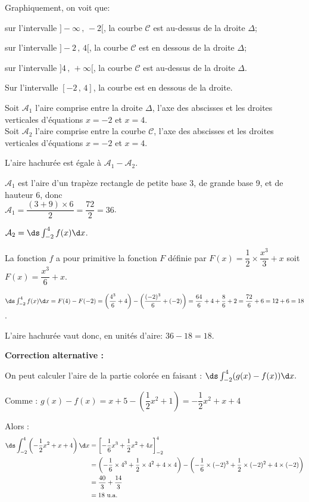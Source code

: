 \medskip

\begin{list}{\textbullet}{Graphiquement, on voit que:}
\item sur l'intervalle $]-\infty\,,\, -2[$, la courbe $\mathcal{C}$ est au-dessus de la droite $\Delta$;
\item sur l'intervalle $]-2\,,\, 4[$, la courbe $\mathcal{C}$ est en dessous de la droite $\Delta$;
\item sur l'intervalle $]4\,,\, +\infty[$, la courbe $\mathcal{C}$ est au-dessus de la droite $\Delta$.
\end{list}

Sur l'intervalle $[-2\,,\,4]$, la courbe est en dessous de la droite.

Soit $\mathcal{A}_1$ l'aire comprise entre la droite $\Delta$, l'axe des abscisses et les droites verticales d'équations $x=-2$ et $x=4$.\\
Soit $\mathcal{A}_2$ l'aire comprise entre la courbe $\mathcal{C}$, l'axe des abscisses et les droites verticales d'équations $x=-2$ et $x=4$.

L'aire hachurée est égale à $\mathcal{A}_1-\mathcal{A}_2$.

\begin{list}{\textbullet}{}
\item $\mathcal{A}_1$ est l'aire d'un trapèze rectangle de petite base 3, de grande base 9, et de hauteur 6, donc\\
 $\mathcal{A}_1=\dfrac{\left (3+ 9\right )\times 6 }{2}=\dfrac{72}{2}=36$.
\item $\mathcal{A}_2 = \ds\int_{-2}^{4}f(x) \d x$.

La fonction $f$ a pour primitive la fonction $F$ définie par $F(x)=\dfrac{1}{2}\times \dfrac{x^3}{3}+x$ soit $F(x)=\dfrac{x^3}{6}+x$.

$\ds\int_{-2}^{4}f(x) \d x 
= F(4)-F(-2)
= \left ( \dfrac{4^3}{6} + 4 \right ) - \left ( \dfrac{(-2)^3}{6} + (-2)\right )
= \dfrac{64}{6}+ 4 + \dfrac{8}{6} + 2
= \dfrac{72}{6}+6 = 12+6=18$.
\end{list}

L'aire hachurée vaut donc, en unités d'aire: $36 - 18 = 18$.

\textbf{Correction alternative :}

On peut calculer l'aire de la partie colorée en faisant :
$\ds\int_{-2}^{4}(g(x)-f(x)) \d x.$

Comme :
$g(x)-f(x) = x + 5 - \left(\dfrac12 x^2 +1\right) = -\dfrac12 x^2 + x + 4$

Alors :
\begin{align*}
\ds\int_{-2}^{4}\left(-\dfrac12 x^2 + x + 4\right) \d x &= \left[-\dfrac{1}{6}x^3 + \dfrac{1}{2}x^2 + 4x\right]_{-2}^{4}\\
&= \left(-\dfrac{1}{6} \times 4^3 + \dfrac{1}{2} \times 4^2 + 4 \times 4\right) - \left(-\dfrac{1}{6} \times (-2)^3 + \dfrac{1}{2} \times (-2)^2 + 4 \times (-2)\right) \\
&= \dfrac{40}{3} + \dfrac{14}{3} \\
&= 18 \text{ u.a.}
\end{align*}
